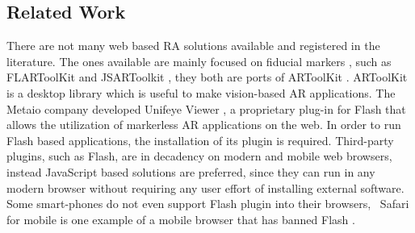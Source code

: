 \subsection{Related Work} %
\label{sub:tracking_library_for_the_web:related_work}

There are not many web based RA solutions available and registered in the literature. The ones available are mainly focused on fiducial markers \cite{Cho1998}, such as FLARToolKit \cite{Yan2011} and JSARToolkit \cite{JSARToolkit2011}, they both are ports of ARToolKit \cite{Hirokazu2002}. ARToolKit is a desktop library which is useful to make vision-based AR applications. The Metaio company developed Unifeye Viewer \cite{Metaio2009}, a proprietary plug-in for Flash \cite{Flash2013} that allows the utilization of markerless AR applications on the web. In order to run Flash based applications, the installation of its plugin is required. Third-party plugins, such as Flash, are in decadency on modern and mobile web browsers, instead JavaScript \cite{International2009} based solutions are preferred, since they can run in any modern browser without requiring any user effort of installing external software. Some smart-phones do not even support Flash plugin into their browsers, \eg\ Safari for mobile \cite{Safari2013} is one example of a mobile browser that has banned Flash \cite{Flash2013}.


